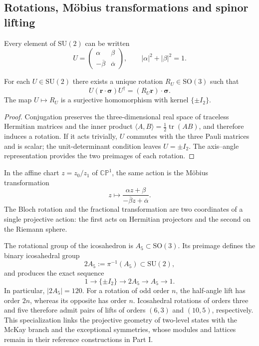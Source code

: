 \subsection{Rotations, Möbius transformations and spinor lifting}

Every element of \(\mathrm{SU}(2)\) can be written
\[
 U=\begin{pmatrix}
 \alpha&\beta\\-\overline\beta&\overline\alpha
 \end{pmatrix},
 \qquad |\alpha|^2+|\beta|^2=1.
\]

\begin{theorem}
\label{thm:su2-so3-bloch-rev2}
For each \(U\in\mathrm{SU}(2)\) there exists a unique rotation
\(R_U\in\mathrm{SO}(3)\) such that
\[
 U(\boldsymbol r\cdot\boldsymbol\sigma)U^\dagger
 =(R_U\boldsymbol r)\cdot\boldsymbol\sigma.
\]
The map \(U\mapsto R_U\) is a surjective homomorphism with kernel
\(\{\pm I_2\}\).
\end{theorem}

\begin{proof}
Conjugation preserves the three-dimensional real space of traceless
Hermitian matrices and the inner product
\(\langle A,B\rangle=\tfrac12\operatorname{tr}(AB)\), and therefore induces a
rotation. If it acts trivially, \(U\) commutes with the three Pauli matrices
and is scalar; the unit-determinant condition leaves \(U=\pm I_2\). The axis--angle
representation provides the two preimages of each rotation.
\end{proof}

In the affine chart \(z=z_0/z_1\) of \(\mathbb {CP}^{1}\), the same action is
the Möbius transformation
\[
 z\longmapsto
 \frac{\alpha z+\beta}{-\overline\beta z+\overline\alpha}.
\]
The Bloch rotation and the fractional transformation are two coordinates of
a single projective action: the first acts on Hermitian projectors and
the second on the Riemann sphere.

The rotational group of the icosahedron is \(A_5\subset\mathrm{SO}(3)\). Its preimage defines the binary icosahedral group
\[
 2A_5:=\pi^{-1}(A_5)\subset\mathrm{SU}(2),
\]
and produces the exact sequence
\begin{equation}
 1\longrightarrow\{\pm I_2\}
 \longrightarrow2A_5\longrightarrow A_5\longrightarrow1.
 \label{eq:extension-central-2a5-rev2}
\end{equation}
In particular, \(|2A_5|=120\). For a rotation of odd order \(n\), the
half-angle lift has order \(2n\), whereas its opposite has
order \(n\). Icosahedral rotations of orders three and five therefore admit
pairs of lifts of orders \((6,3)\) and \((10,5)\),
respectively. This specialization links the
projective geometry of two-level states with the McKay branch and the
exceptional symmetries, whose modules and lattices remain in their
reference constructions in Part I.

